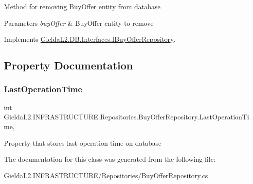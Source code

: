 Method for removing Buy\+Offer entity from database 


\begin{DoxyParams}{Parameters}
{\em buy\+Offer} & Buy\+Offer entity to remove\\
\hline
\end{DoxyParams}


Implements \mbox{\hyperlink{interface_gielda_l2_1_1_d_b_1_1_interfaces_1_1_i_buy_offer_repository_af9d25dfd52c71cc21dd7a89bf54f2ee4}{Gielda\+L2.\+D\+B.\+Interfaces.\+I\+Buy\+Offer\+Repository}}.



\subsection{Property Documentation}
\mbox{\label{class_gielda_l2_1_1_i_n_f_r_a_s_t_r_u_c_t_u_r_e_1_1_repositories_1_1_buy_offer_repository_aa2fa49c9bc8775391160b85ea09d0cda}} 
\subsubsection{\texorpdfstring{LastOperationTime}{LastOperationTime}}
{\footnotesize\ttfamily int Gielda\+L2.\+I\+N\+F\+R\+A\+S\+T\+R\+U\+C\+T\+U\+R\+E.\+Repositories.\+Buy\+Offer\+Repository.\+Last\+Operation\+Time\hspace{0.3cm}{\ttfamily [get]}, {\ttfamily [set]}}



Property that stores last operation time on database 



The documentation for this class was generated from the following file\+:\begin{DoxyCompactItemize}
\item 
Gielda\+L2.\+I\+N\+F\+R\+A\+S\+T\+R\+U\+C\+T\+U\+R\+E/\+Repositories/Buy\+Offer\+Repository.\+cs\end{DoxyCompactItemize}

